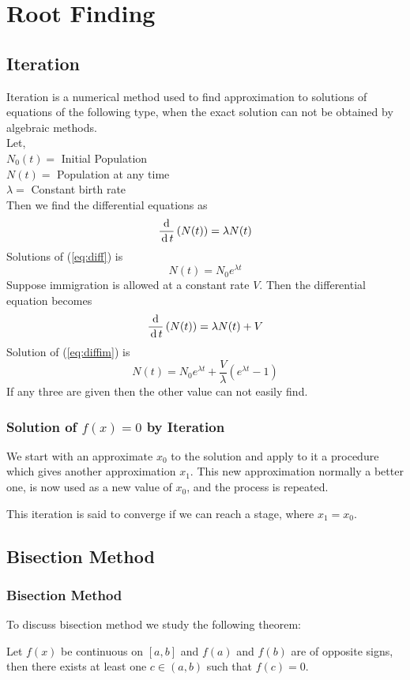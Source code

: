 \documentclass[12pt,class=book,crop=false]{standalone}
\begin{document}
\chapter{Root Finding}
\section{Iteration}
Iteration is a numerical method used to find approximation to solutions of equations of the following type, when the exact solution can not be obtained by algebraic methods.\\
Let,\\
\indent \( N_0(t) =\) Initial Population\\
\indent \( N(t) =\) Population at any time\\
\indent \( \lambda =\) Constant birth rate\\
Then we find the differential equations as
\begin{equation}
    \frac{\,\mathrm{d}\,}{\,\mathrm{d}\, t}\left(N(t)\right)=\lambda N(t) \label{eq:diff}
\end{equation}
Solutions of (\ref{eq:diff}) is
\[
    N(t)=N_0e^{\lambda t}
\]
Suppose immigration is allowed at a constant rate \( V \). Then the differential equation becomes
\begin{equation}
    \frac{\,\mathrm{d}\,}{\,\mathrm{d}\, t}\left(N(t)\right)=\lambda N(t) +V\label{eq:diffim}
\end{equation}
Solution of (\ref{eq:diffim}) is
\[
    N(t)=N_0e^{\lambda t}+\frac{V}{\lambda}(e^{\lambda t}-1)
\]
If any three are given then the other value can not easily find.
\subsection{Solution of \( f(x)=0 \) by Iteration}
We start with an approximate \( x_0 \) to the solution and apply to it a procedure which gives another approximation \( x_1 \). This new approximation normally a better one, is now used as a new value of \( x_0 \), and the process is repeated.

This iteration is said to converge if we can reach a stage, where \( x_1=x_0 \).
\section{Bisection Method}
\subsection{Bisection Method}
To discuss bisection method we study the following theorem:
\begin{thm}
    Let \( f(x) \) be continuous on \( [a,b] \) and \( f(a) \) and \( f(b) \) are of opposite signs, then there exists at least one \( c\in(a,b) \) such that \( f(c)=0 \). \label{thm:bisec}
\end{thm}
\end{document}
